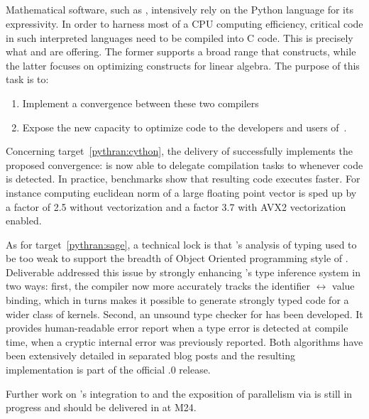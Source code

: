   \subparagraph{}

Mathematical software, such as \Sage, intensively rely on the Python
language for its expressivity. In order to harness most of a CPU computing
efficiency, critical code in such interpreted languages need to be compiled into
C code. This is precisely what \Cython and \Pythran are offering. The former
supports a broad range that \Python constructs, while the latter focuses on optimizing
\Numpy constructs for linear algebra.
The purpose of this task is to:
\begin{enumerate}
\item\label{pythran:cython} Implement a convergence between these two compilers
\item\label{pythran:sage} Expose the new capacity to optimize \Numpy code to
  the developers and  users of~\Sage.
\end{enumerate}

Concerning target~\ref{pythran:cython}, the delivery of  successfully implements the
proposed convergence: \Cython is now able to delegate compilation tasks to
\Pythran whenever \Numpy code is detected. In practice, benchmarks show that
resulting code executes faster. For instance computing euclidean norm of a large
floating point vector is sped up by a factor of 2.5 without vectorization and
a factor 3.7 with AVX2 vectorization enabled.

As for target~\ref{pythran:sage}, a technical lock is that \Pythran's analysis
of \Python typing used to be too weak to support the breadth of Object Oriented
programming style of \Sage. Deliverable 
addressed this issue by strongly enhancing \Pythran's type inference system in two ways: first, the compiler now more accurately tracks the identifier
$\leftrightarrow$ value binding, which in turns makes it possible to generate strongly
typed code for a wider class of \Python kernels.  Second, an unsound type checker for
\Pythran has been developed. It provides human-readable error report when a type error is
detected at compile time, when a cryptic internal error was previously reported. Both
algorithms have been extensively detailed in separated blog posts and the resulting
implementation is part of the official .0 release.

Further work on \Pythran's integration to \Sage and the exposition of
parallelism via  is still in progress and should be delivered in
 at M24.

